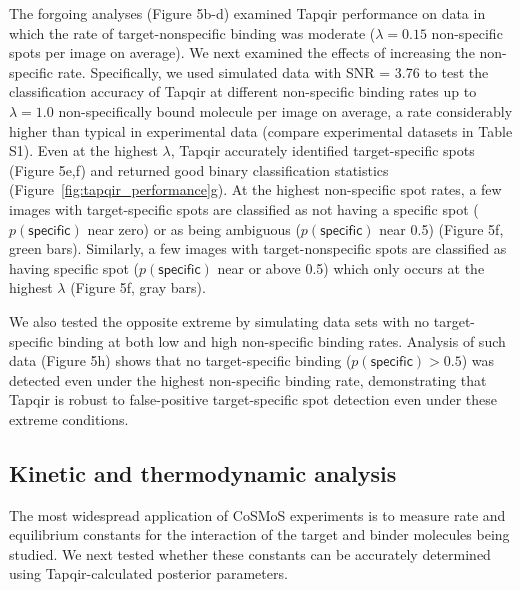 The forgoing analyses (Figure 5b-d) examined Tapqir performance on data in which the rate of target-nonspecific binding was moderate ($\lambda  = 0.15$ non-specific spots per image on average).  We next examined the effects of increasing the non-specific rate.  Specifically, we used  simulated data with SNR = 3.76 to test the classification accuracy of Tapqir at different non-specific binding rates up to $\lambda  = 1.0$ non-specifically bound molecule per image on average, a rate considerably higher than typical in experimental data (compare experimental datasets in Table S1).  Even at the highest $\lambda$,  Tapqir accurately identified target-specific spots (Figure 5e,f) and returned good binary classification statistics (Figure~\ref{fig:tapqir_performance}g).  At the highest non-specific spot rates, a few images with target-specific spots are classified as not having a specific spot ($p(\mathsf{specific})$ near zero) or as being ambiguous ($p(\mathsf{specific})$ near 0.5) (Figure 5f, green bars). Similarly, a few images with target-nonspecific spots are classified as having specific spot ($p(\mathsf{specific})$ near or above 0.5) which only occurs at the highest $\lambda$ (Figure 5f, gray bars).

We also tested the opposite extreme by simulating data sets with no target-specific binding at both low and high non-specific binding rates. Analysis of such data  (Figure 5h) shows that no target-specific binding ($p(\mathsf{specific}) > 0.5$) was detected even under the highest non-specific binding rate, demonstrating that Tapqir is robust to false-positive target-specific spot detection even under these extreme conditions. 

\subsection*{Kinetic and thermodynamic analysis}

The most widespread application of CoSMoS experiments is to measure rate and equilibrium constants for the interaction of the target and binder molecules being studied.  We next tested whether these constants can be accurately determined using Tapqir-calculated posterior parameters. 

